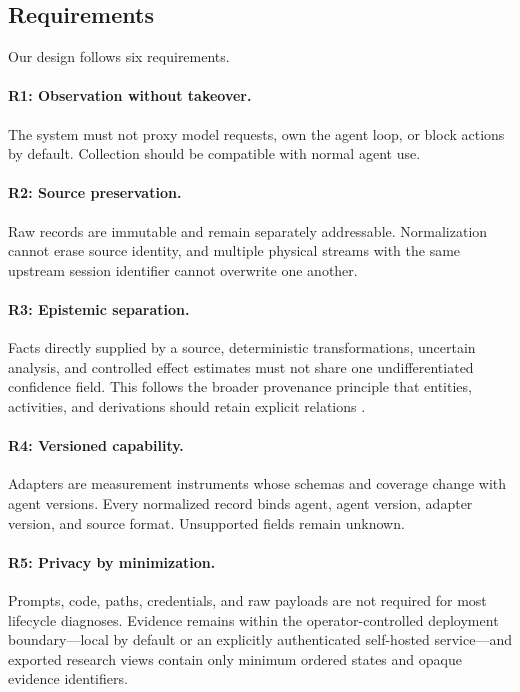 \documentclass[runningheads]{llncs}
\begin{document}
\subsection{Requirements}

Our design follows six requirements.

\paragraph{R1: Observation without takeover.}
The system must not proxy model requests, own the agent loop, or block actions
by default.  Collection should be compatible with normal agent use.

\paragraph{R2: Source preservation.}
Raw records are immutable and remain separately addressable.  Normalization
cannot erase source identity, and multiple physical streams with the same
upstream session identifier cannot overwrite one another.

\paragraph{R3: Epistemic separation.}
Facts directly supplied by a source, deterministic transformations, uncertain
analysis, and controlled effect estimates must not share one undifferentiated
confidence field.  This follows the broader provenance principle that entities,
activities, and derivations should retain explicit relations
\cite{w3c-prov-dm}.

\paragraph{R4: Versioned capability.}
Adapters are measurement instruments whose schemas and coverage change with
agent versions.  Every normalized record binds agent, agent version, adapter
version, and source format.  Unsupported fields remain unknown.

\paragraph{R5: Privacy by minimization.}
Prompts, code, paths, credentials, and raw payloads are not required for most
lifecycle diagnoses. Evidence remains within the operator-controlled deployment
boundary---local by default or an explicitly authenticated self-hosted
service---and exported research views contain only minimum ordered states and
opaque evidence identifiers.
\end{document}

